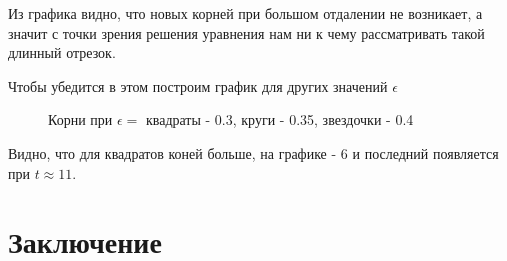 \documentclass[14pt]{extarticle}
\newcommand{\sectionbreak}{\clearpage}
\begin{document}
Из графика видно, что новых корней при большом отдалении не возникает, а значит с точки зрения решения уравнения нам ни к чему рассматривать такой длинный отрезок.

Чтобы убедится в этом построим график для других значений $\epsilon$

\begin{figure}[h]
	\caption{Корни при $\epsilon = $ квадраты - 0.3, круги - 0.35, звездочки - 0.4}
	\label{ris:roots2}
\end{figure}

Видно, что для квадратов коней больше, на графике - 6 и последний появляется при $t \approx 11$.

\sectionbreak
\section*{Заключение}
  

 
\newpage
\end{document}
